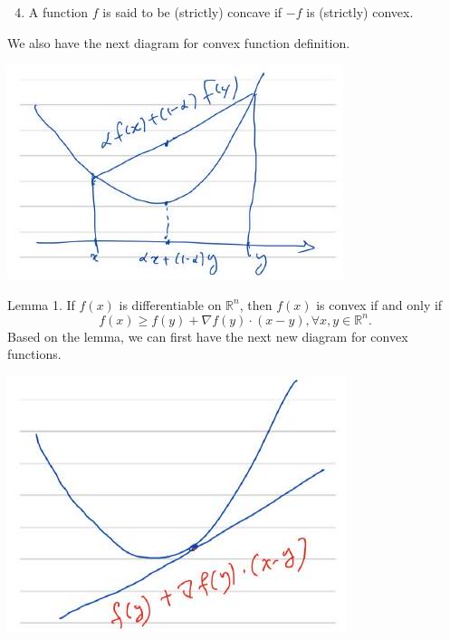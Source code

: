 \documentclass[10pt]{article}
\begin{document}
\begin{enumerate}
  \setcounter{enumi}{3}
  \item A function $f$ is said to be (strictly) concave if $-f$ is (strictly) convex.
\end{enumerate}
We also have the next diagram for convex function definition.

\includegraphics[max width=\textwidth]{2022_03_25_9faca01b68c57c6da639g-4}

Lemma 1. If $f(x)$ is differentiable on $\mathbb{R}^{n}$, then $f(x)$ is convex if and only if
$$
f(x) \geq f(y)+\nabla f(y) \cdot(x-y), \forall x, y \in \mathbb{R}^{n} .
$$
Based on the lemma, we can first have the next new diagram for convex functions.

\includegraphics[max width=\textwidth]{2022_03_25_9faca01b68c57c6da639g-4(1)}
\end{document}

